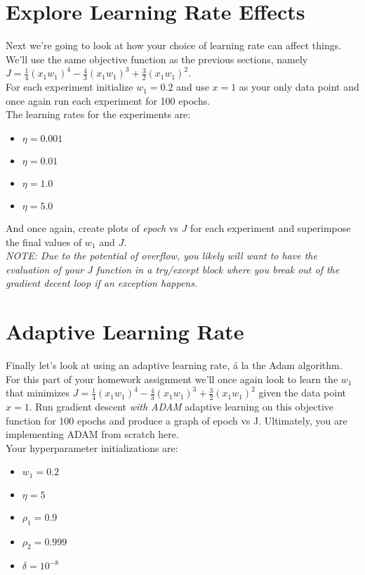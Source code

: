 \documentclass[12pt]{article}
\begin{document}
\newpage
\section{Explore Learning Rate Effects}
Next we're going to look at how your choice of learning rate can affect things.  We'll use the same objective function as the previous sections, namely $J=\frac{1}{4}(x_1 w_1)^4-\frac{4}{3}(x_1 w_1)^3+\frac{3}{2}(x_1 w_1)^2$.\\

\noindent
For each experiment initialize $w_1=0.2$ and use $x=1$ as your only data point and once again run each experiment for 100 epochs.  \\

\noindent
The learning rates for the experiments are:
\begin{itemize}
\item $\eta=0.001$
\item $\eta=0.01$
\item $\eta=1.0$
\item $\eta=5.0$
\end{itemize}

\noindent
And once again, create plots of \emph{epoch} vs $J$ for each experiment and superimpose the final values of $w_1$ and $J$.\\

\noindent
\emph{NOTE: Due to the potential of overflow, you likely will want to have the evaluation of your $J$ function in a try/except block where you break out of the gradient decent loop if an exception happens.}

\newpage
\section{Adaptive Learning Rate}
Finally let's look at using an adaptive learning rate, \'{a} la the Adam algorithm.\\

\noindent
For this part of your homework assignment we'll once again look to learn the $w_1$ that minimizes $J=\frac{1}{4}(x_1 w_1)^4-\frac{4}{3}(x_1 w_1)^3+\frac{3}{2}(x_1 w_1)^2$ given the data point $x=1$.  Run gradient descent \emph{with ADAM} adaptive learning on this objective function for 100 epochs and produce a graph of epoch vs J.  Ultimately, you are implementing ADAM from scratch here. \\  

\noindent
Your hyperparameter initializations are:
\begin{itemize}
\item $w_1=0.2$
\item $\eta = 5$
\item $\rho_1 = 0.9$
\item $\rho_2 = 0.999$
\item $\delta=10^{-8}$
\end{itemize}
\end{document}
